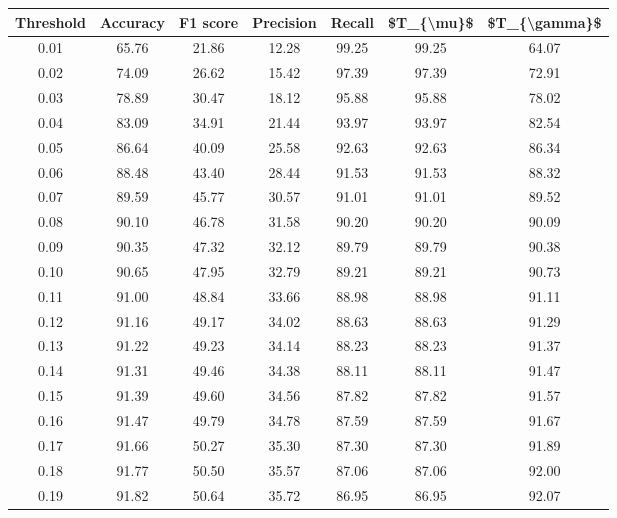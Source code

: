 \begin{tabular}{|c|c|c|c|c|c|c|}
\toprule
 Threshold &  Accuracy &  F1 score &  Precision &  Recall &  \$T\_\{\textbackslash mu\}\$ &  \$T\_\{\textbackslash gamma\}\$ \\
\hline
      0.01 &     65.76 &     21.86 &      12.28 &   99.25 &      99.25 &         64.07 \\
      0.02 &     74.09 &     26.62 &      15.42 &   97.39 &      97.39 &         72.91 \\
      0.03 &     78.89 &     30.47 &      18.12 &   95.88 &      95.88 &         78.02 \\
      0.04 &     83.09 &     34.91 &      21.44 &   93.97 &      93.97 &         82.54 \\
      0.05 &     86.64 &     40.09 &      25.58 &   92.63 &      92.63 &         86.34 \\
      0.06 &     88.48 &     43.40 &      28.44 &   91.53 &      91.53 &         88.32 \\
      0.07 &     89.59 &     45.77 &      30.57 &   91.01 &      91.01 &         89.52 \\
      0.08 &     90.10 &     46.78 &      31.58 &   90.20 &      90.20 &         90.09 \\
      0.09 &     90.35 &     47.32 &      32.12 &   89.79 &      89.79 &         90.38 \\
      0.10 &     90.65 &     47.95 &      32.79 &   89.21 &      89.21 &         90.73 \\
      0.11 &     91.00 &     48.84 &      33.66 &   88.98 &      88.98 &         91.11 \\
      0.12 &     91.16 &     49.17 &      34.02 &   88.63 &      88.63 &         91.29 \\
      0.13 &     91.22 &     49.23 &      34.14 &   88.23 &      88.23 &         91.37 \\
      0.14 &     91.31 &     49.46 &      34.38 &   88.11 &      88.11 &         91.47 \\
      0.15 &     91.39 &     49.60 &      34.56 &   87.82 &      87.82 &         91.57 \\
      0.16 &     91.47 &     49.79 &      34.78 &   87.59 &      87.59 &         91.67 \\
      0.17 &     91.66 &     50.27 &      35.30 &   87.30 &      87.30 &         91.89 \\
      0.18 &     91.77 &     50.50 &      35.57 &   87.06 &      87.06 &         92.00 \\
      0.19 &     91.82 &     50.64 &      35.72 &   86.95 &      86.95 &         92.07 \\

\end{tabular}
